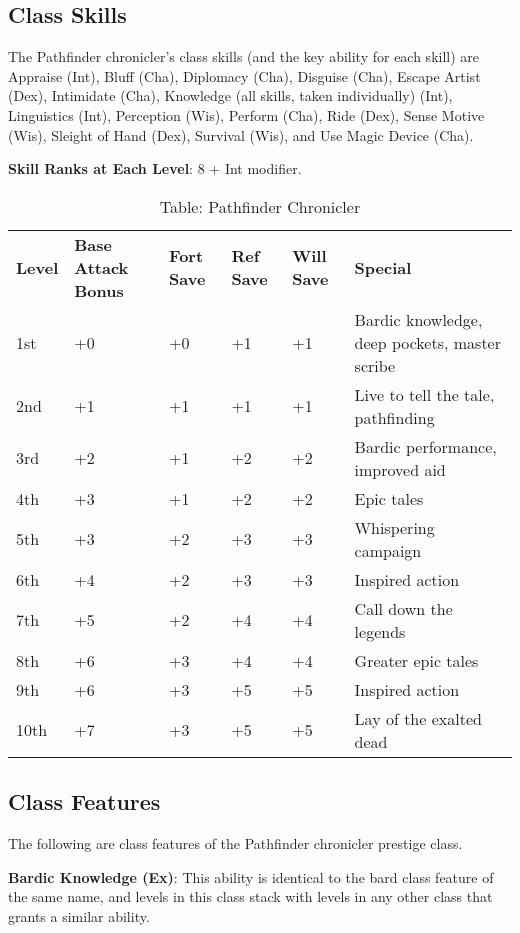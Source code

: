 \subsection{Class Skills}

				
The Pathfinder chronicler's class skills (and the key ability for each skill) are Appraise (Int), Bluff (Cha), Diplomacy (Cha), Disguise (Cha), Escape Artist (Dex), Intimidate (Cha), Knowledge (all skills, taken individually) (Int), Linguistics (Int), Perception (Wis), Perform (Cha), Ride (Dex), Sense Motive (Wis), Sleight of Hand (Dex), Survival (Wis), and Use Magic Device (Cha). 
				
\textbf{ Skill Ranks at Each Level}: 8 + Int modifier.

\begin{table*}[]
\sffamily
\caption{Table: Pathfinder Chronicler}
\begin{tabular}{llllll}
\textbf{Level} & \textbf{Base Attack Bonus} & \textbf{Fort Save} & \textbf{Ref Save} & \textbf{Will Save} & \textbf{Special}\\
1st & +0 & +0 & +1 & +1 & Bardic knowledge, deep pockets, master scribe\\
2nd & +1 & +1 & +1 & +1 & Live to tell the tale, pathfinding\\
3rd & +2 & +1 & +2 & +2 & Bardic performance, improved aid\\
4th & +3 & +1 & +2 & +2 & Epic tales\\
5th & +3 & +2 & +3 & +3 & Whispering campaign\\
6th & +4 & +2 & +3 & +3 & Inspired action\\
7th & +5 & +2 & +4 & +4 & Call down the legends\\
8th & +6 & +3 & +4 & +4 & Greater epic tales\\
9th & +6 & +3 & +5 & +5 & Inspired action\\
10th & +7 & +3 & +5 & +5 & Lay of the exalted dead\\
\end{tabular}
\end{table*}
				
\subsection{Class Features}

				
The following are class features of the Pathfinder chronicler prestige class.
				
\textbf{Bardic Knowledge (Ex)}: This ability is identical to the bard class feature of the same name, and levels in this class stack with levels in any other class that grants a similar ability. 
				
